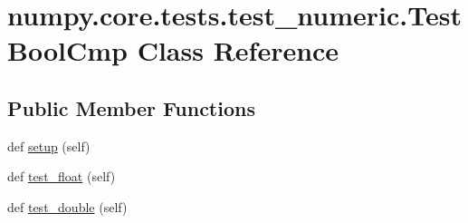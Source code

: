 \hypertarget{classnumpy_1_1core_1_1tests_1_1test__numeric_1_1TestBoolCmp}{}\section{numpy.\+core.\+tests.\+test\+\_\+numeric.\+Test\+Bool\+Cmp Class Reference}
\label{classnumpy_1_1core_1_1tests_1_1test__numeric_1_1TestBoolCmp}
\subsection*{Public Member Functions}
\begin{DoxyCompactItemize}
\item 
def \hyperlink{classnumpy_1_1core_1_1tests_1_1test__numeric_1_1TestBoolCmp_a47ae45f1587b027339cdfb45967b2d18}{setup} (self)
\item 
def \hyperlink{classnumpy_1_1core_1_1tests_1_1test__numeric_1_1TestBoolCmp_afaa80b3d64135e8927ad94020cfa1446}{test\+\_\+float} (self)
\item 
def \hyperlink{classnumpy_1_1core_1_1tests_1_1test__numeric_1_1TestBoolCmp_a05f8424c1877bd7993fc0c9186b989fb}{test\+\_\+double} (self)
\end{DoxyCompactItemize}

